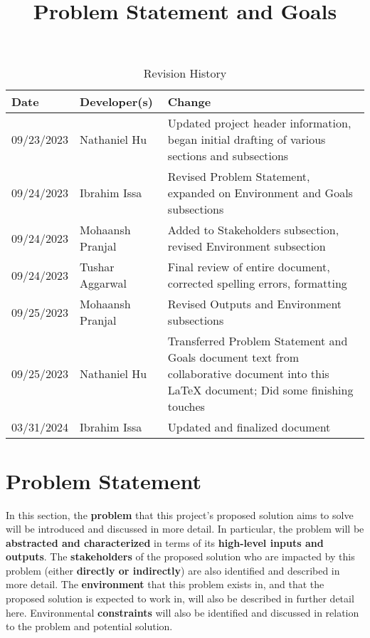 \documentclass{article}
\title{Problem Statement and Goals \\\progname}
\author{\authname}
\date{}
\begin{document}
\maketitle

\begin{table}[hp]
\caption{Revision History} \label{TblRevisionHistory}
\begin{tabularx}{\textwidth}{llX}
\toprule
\textbf{Date} & \textbf{Developer(s)} & \textbf{Change}\\
\midrule
09/23/2023 & Nathaniel Hu & Updated project header information, began initial drafting of various sections and subsections \\
09/24/2023 & Ibrahim Issa & Revised Problem Statement, expanded on Environment and Goals subsections \\
09/24/2023 & Mohaansh Pranjal & Added to Stakeholders subsection, revised Environment subsection \\
09/24/2023 & Tushar Aggarwal & Final review of entire document, corrected spelling errors, formatting \\
09/25/2023 & Mohaansh Pranjal & Revised Outputs and Environment subsections \\
09/25/2023 & Nathaniel Hu & Transferred Problem Statement and Goals document text from collaborative document into this LaTeX document; Did some finishing touches \\
03/31/2024 & Ibrahim Issa & Updated and finalized document\\
\bottomrule
\end{tabularx}
\end{table}

\section{Problem Statement}

In this section, the \textbf{problem} that this project's proposed solution aims to solve will be introduced and discussed in more detail.
In particular, the problem will be \textbf{abstracted and characterized} in terms of its \textbf{high-level inputs and outputs}.
The \textbf{stakeholders} of the proposed solution who are impacted by this problem (either \textbf{directly or indirectly}) are also identified and described in more detail.
The \textbf{environment} that this problem exists in, and that the proposed solution is expected to work in, will also be described in further detail here.
Environmental \textbf{constraints} will also be identified and discussed in relation to the problem and potential solution.
\end{document}
